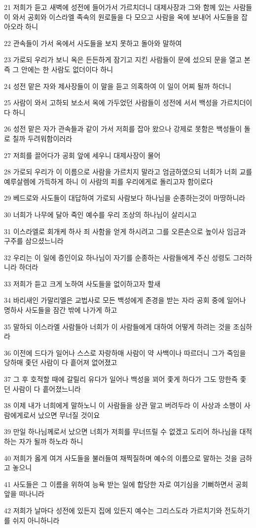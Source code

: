 \par 21 저희가 듣고 새벽에 성전에 들어가서 가르치더니 대제사장과 그와 함께 있는 사람들이 와서 공회와 이스라엘 족속의 원로들을 다 모으고 사람을 옥에 보내어 사도들을 잡아오라 하니
\par 22 관속들이 가서 옥에서 사도들을 보지 못하고 돌아와 말하여
\par 23 가로되 우리가 보니 옥은 든든하게 잠기고 지킨 사람들이 문에 섰으되 문을 열고 본즉 그 안에는 한 사람도 없더이다 하니
\par 24 성전 맡은 자와 제사장들이 이 말을 듣고 의혹하여 이 일이 어찌 될까 하더니
\par 25 사람이 와서 고하되 보소서 옥에 가두었던 사람들이 성전에 서서 백성을 가르치더이다 하니
\par 26 성전 맡은 자가 관속들과 같이 가서 저희를 잡아 왔으나 강제로 못함은 백성들이 돌로 칠까 두려워함이러라
\par 27 저희를 끌어다가 공회 앞에 세우니 대제사장이 물어
\par 28 가로되 우리가 이 이름으로 사람을 가르치지 말라고 엄금하였으되 너희가 너희 교를 예루살렘에 가득하게 하니 이 사람의 피를 우리에게로 돌리고자 함이로다
\par 29 베드로와 사도들이 대답하여 가로되 사람보다 하나님을 순종하는것이 마땅하니라
\par 30 너희가 나무에 달아 죽인 예수를 우리 조상의 하나님이 살리시고
\par 31 이스라엘로 회개케 하사 죄 사함을 얻게 하시려고 그를 오른손으로 높이사 임금과 구주를 삼으셨느니라
\par 32 우리는 이 일에 증인이요 하나님이 자기를 순종하는 사람들에게 주신 성령도 그러하니라 하더라
\par 33 저희가 듣고 크게 노하여 사도들을 없이하고자 할새
\par 34 바리새인 가말리엘은 교법사로 모든 백성에게 존경을 받는 자라 공회 중에 일어나 명하사 사도들을 잠간 밖에 나가게 하고
\par 35 말하되 이스라엘 사람들아 너희가 이 사람들에게 대하여 어떻게 하려는 것을 조심하라
\par 36 이전에 드다가 일어나 스스로 자랑하매 사람이 약 사백이나 따르더니 그가 죽임을 당하매 좇던 사람이 다 흩어져 없어졌고
\par 37 그 후 호적할 때에 갈릴리 유다가 일어나 백성을 꾀어 좇게 하다가 그도 망한즉 좇던 사람이 다 흩어졌느니라
\par 38 이제 내가 너희에게 말하노니 이 사람들을 상관 말고 버려두라 이 사상과 소행이 사람에게로서 났으면 무너질 것이요
\par 39 만일 하나님께로서 났으면 너희가 저희를 무너뜨릴 수 없겠고 도리어 하나님을 대적하는 자가 될까 하노라 하니
\par 40 저희가 옳게 여겨 사도들을 불러들여 채찍질하며 예수의 이름으로 말하는 것을 금하고 놓으니
\par 41 사도들은 그 이름을 위하여 능욕 받는 일에 합당한 자로 여기심을 기뻐하면서 공회 앞을 떠나니라
\par 42 저희가 날마다 성전에 있든지 집에 있든지 예수는 그리스도라 가르치기와 전도하기를 쉬지 아니하니라

